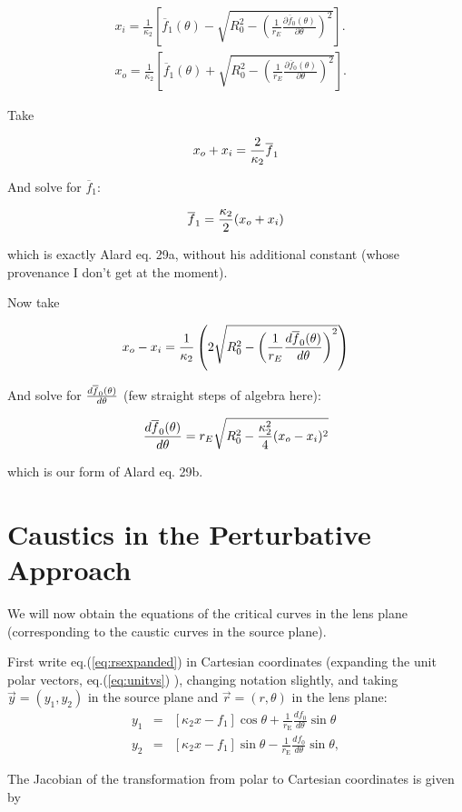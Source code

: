 \documentclass{article}
\def\be{\begin{equation}}
\def\ee{\end{equation}}
\def\bea{\begin{eqnarray}}
\def\eea{\end{eqnarray}}
\def\eqref{eq.(\ref}
\newcommand{\rp}{\right)}
\newcommand{\lp}{\left(}
\def\dfdt{{d \overline{f}_0(\theta) \over d \theta}}
\def\fbar{\overline{f}_1}
\def \te {\theta}
\def \re {r_{\mathrm{E}}}
\def \te {\theta}
\def \kt {\kappa_2}
\begin{document}
\bea
x_i = \frac{1}{\kappa_2}\left[ \overline{f}_{1}(\theta) - \sqrt{R_0^2 - \left( \frac{1}{r_E}\frac{\partial \overline{f}_0(\theta)}{\partial \theta} \right)^2} \right]. \;\;\;  \\
x_o = \frac{1}{\kappa_2}\left[ \overline{f}_{1}(\theta) + \sqrt{R_0^2 - \left( \frac{1}{r_E}\frac{\partial \overline{f}_0(\theta)}{\partial \theta} \right)^2} \right]. \;\;\;  
\eea


Take 

\be
x_o + x_i = {2 \over \kappa_2} \fbar 
\ee

And solve for $\fbar$:


\be
\fbar = {\kappa_2 \over 2} (x_o+x_i)
\ee

which is exactly Alard eq. 29a, without his additional constant (whose provenance I don't get at the moment).

Now take 

\be
x_o - x_i = {1 \over \kappa_2} \lp 2 \sqrt{R_0^2 - {\lp {1 \over r_E} \dfdt \rp}^2 }\rp
\ee

And solve for $\dfdt$ (few straight steps of algebra here):

\be
\dfdt = r_E \sqrt{R_0^2 - {\kappa_2^2 \over 4} (x_o-x_i)^2 }
\ee

which is our form of Alard eq. 29b.


\section{Caustics in the Perturbative Approach}


We will now obtain the equations of the critical curves in the lens
plane (corresponding to the caustic curves in the source plane).

First write \eqref{eq:rsexpanded}) in Cartesian coordinates (expanding
the unit polar vectors, \eqref{eq:unitvs}) ), changing notation
slightly, and taking $\vec{y}=(y_1,y_2)$ in the source plane and
$\vec{r}=(r,\te)$ in the lens plane:
\begin{eqnarray}
y_1 &=& [\kt x - f_1]\cos{\te}+\frac{1}{\re}\frac{d f_0}{d\te}\sin{\te} \label{y_1}\\
y_2 &=& [\kt x - f_1]\sin{\te}-\frac{1}{\re}\frac{d f_0}{d\te}\sin{\te} \label{y_2},
\end{eqnarray}

The Jacobian of the transformation from polar to Cartesian coordinates is given by
\end{document}
